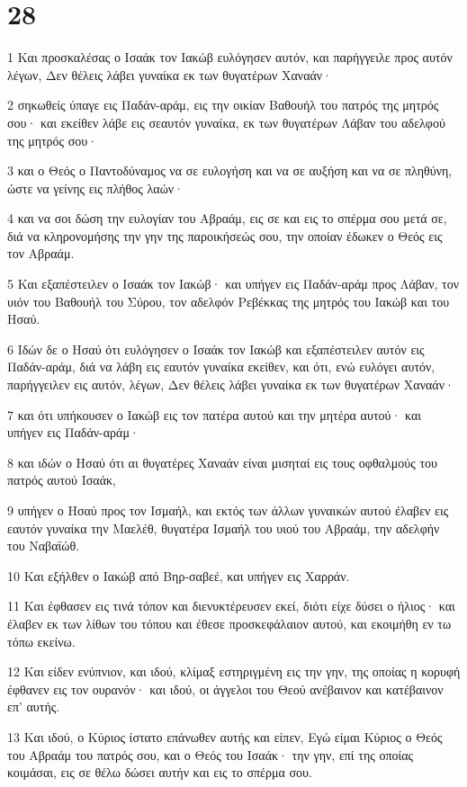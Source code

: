 \chapter{28}

\par 1 Και προσκαλέσας ο Ισαάκ τον Ιακώβ ευλόγησεν αυτόν, και παρήγγειλε προς αυτόν λέγων, Δεν θέλεις λάβει γυναίκα εκ των θυγατέρων Χαναάν·
\par 2 σηκωθείς ύπαγε εις Παδάν-αράμ, εις την οικίαν Βαθουήλ του πατρός της μητρός σου· και εκείθεν λάβε εις σεαυτόν γυναίκα, εκ των θυγατέρων Λάβαν του αδελφού της μητρός σου·
\par 3 και ο Θεός ο Παντοδύναμος να σε ευλογήση και να σε αυξήση και να σε πληθύνη, ώστε να γείνης εις πλήθος λαών·
\par 4 και να σοι δώση την ευλογίαν του Αβραάμ, εις σε και εις το σπέρμα σου μετά σε, διά να κληρονομήσης την γην της παροικήσεώς σου, την οποίαν έδωκεν ο Θεός εις τον Αβραάμ.
\par 5 Και εξαπέστειλεν ο Ισαάκ τον Ιακώβ· και υπήγεν εις Παδάν-αράμ προς Λάβαν, τον υιόν του Βαθουήλ του Σύρου, τον αδελφόν Ρεβέκκας της μητρός του Ιακώβ και του Ησαύ.
\par 6 Ιδών δε ο Ησαύ ότι ευλόγησεν ο Ισαάκ τον Ιακώβ και εξαπέστειλεν αυτόν εις Παδάν-αράμ, διά να λάβη εις εαυτόν γυναίκα εκείθεν, και ότι, ενώ ευλόγει αυτόν, παρήγγειλεν εις αυτόν, λέγων, Δεν θέλεις λάβει γυναίκα εκ των θυγατέρων Χαναάν·
\par 7 και ότι υπήκουσεν ο Ιακώβ εις τον πατέρα αυτού και την μητέρα αυτού· και υπήγεν εις Παδάν-αράμ·
\par 8 και ιδών ο Ησαύ ότι αι θυγατέρες Χαναάν είναι μισηταί εις τους οφθαλμούς του πατρός αυτού Ισαάκ,
\par 9 υπήγεν ο Ησαύ προς τον Ισμαήλ, και εκτός των άλλων γυναικών αυτού έλαβεν εις εαυτόν γυναίκα την Μαελέθ, θυγατέρα Ισμαήλ του υιού του Αβραάμ, την αδελφήν του Ναβαϊώθ.
\par 10 Και εξήλθεν ο Ιακώβ από Βηρ-σαβεέ, και υπήγεν εις Χαρράν.
\par 11 Και έφθασεν εις τινά τόπον και διενυκτέρευσεν εκεί, διότι είχε δύσει ο ήλιος· και έλαβεν εκ των λίθων του τόπου και έθεσε προσκεφάλαιον αυτού, και εκοιμήθη εν τω τόπω εκείνω.
\par 12 Και είδεν ενύπνιον, και ιδού, κλίμαξ εστηριγμένη εις την γην, της οποίας η κορυφή έφθανεν εις τον ουρανόν· και ιδού, οι άγγελοι του Θεού ανέβαινον και κατέβαινον επ' αυτής.
\par 13 Και ιδού, ο Κύριος ίστατο επάνωθεν αυτής και είπεν, Εγώ είμαι Κύριος ο Θεός του Αβραάμ του πατρός σου, και ο Θεός του Ισαάκ· την γην, επί της οποίας κοιμάσαι, εις σε θέλω δώσει αυτήν και εις το σπέρμα σου.
